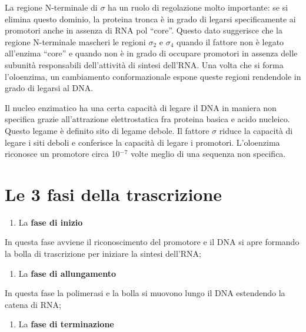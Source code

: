 \documentclass[11pt]{book}
\begin{document}
La regione N-terminale di \(\sigma\) ha un ruolo di regolazione molto
importante: se si elimina questo dominio, la proteina tronca è in grado
di legarsi specificamente ai promotori anche in assenza di RNA pol
``core''. Questo dato suggerisce che la regione N-terminale mascheri le
regioni \(\sigma\)\(_2\) e \(\sigma\)\(_4\) quando il fattore non è
legato all'enzima ``core'' e quando non è in grado di occupare promotori
in assenza delle subunità responsabili dell'attività di sintesi
dell'RNA. Una volta che si forma l'oloenzima, un cambiamento
conformazionale espone queste regioni rendendole in grado di legarsi al
DNA.

Il nucleo enzimatico ha una certa capacità di legare il DNA in maniera
non specifica grazie all'attrazione elettrostatica fra proteina basica e
acido nucleico. Questo legame è definito sito di legame debole. Il
fattore \(\sigma\) riduce la capacità di legare i siti deboli e
conferisce la capacità di legare i promotori. L'oloenzima riconosce un
promotore circa 10\(^-\)\(^7\) volte meglio di una sequenza non
specifica.

\section{Le 3 fasi della
trascrizione}\label{le-3-fasi-della-trascrizione}

\begin{enumerate}
\def\labelenumi{\arabic{enumi}.}
\itemsep1pt\parskip0pt
\item
  La \textbf{fase di inizio}
\end{enumerate}

In questa fase avviene il riconoscimento del promotore e il DNA si apre
formando la bolla di trascrizione per iniziare la sintesi dell'RNA;

\begin{enumerate}
\def\labelenumi{\arabic{enumi}.}
\setcounter{enumi}{1}
\itemsep1pt\parskip0pt
\item
  La \textbf{fase di allungamento}
\end{enumerate}

In questa fase la polimerasi e la bolla si muovono lungo il DNA
estendendo la catena di RNA;

\begin{enumerate}
\def\labelenumi{\arabic{enumi}.}
\setcounter{enumi}{2}
\itemsep1pt\parskip0pt
\item
  La \textbf{fase di terminazione}
\end{enumerate}
\end{document}
